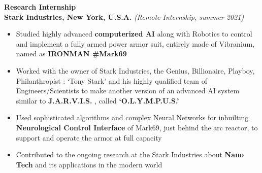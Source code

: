 \documentclass[]{article}
\begin{document}
\thispagestyle{fancy}
\setlength{\headheight}{47 pt}


\textcolor{blue!60!black}{\Large\textbf{Research Internship}}
\vspace{1 em}\\
\textbf{Stark Industries, New York, U.S.A.}
\hfill\textit{\small(Remote Internship, summer 2021)}
\begin{itemize}
    \item Studied highly advanced \textbf{computerized AI} along with Robotics to control and implement a fully armed power armor suit, entirely made of Vibranium, named as \textbf{IRONMAN \#Mark69}
    \item Worked with the owner of Stark Industries, the Genius, Billionaire, Playboy, Philanthropist : `Tony Stark' and his highly qualified team of Engineers/Scientists to make another version of an advanced AI system similar to \textbf{J.A.R.V.I.S.} , called \textbf{`O.L.Y.M.P.U.S.'}
    \item Used sophisticated algorithms and complex Neural Networks for inbuilting \textbf{Neurological Control Interface} of Mark69, just behind the arc reactor, to support and operate the armor at full capacity
    \item Contributed to the ongoing research at the Stark Industries about \textbf{Nano Tech} and its applications in the modern world
\end{itemize}
\vspace{1.25 em}
\end{document}
